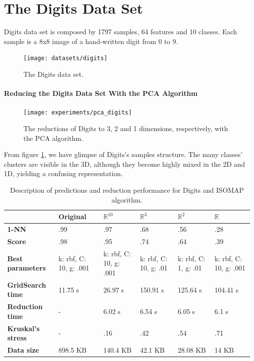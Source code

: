 \clearpage
\section{The Digits Data Set}

Digits data set is composed by 1797 samples, 64 features and 10 classes. Each sample is a 8x8 image of a hand-written digit from 0 to 9.
\newline\newline

\begin{figure}[H]
	\centering
	\captionsetup{justification=centering}
	\texttt{[image: datasets/digits]}
	\caption{The Digits data set.}
\end{figure}

\newpage
\paragraph{Reducing the Digits Data Set With the PCA Algorithm}

\begin{figure}[H]
	\centering
	\captionsetup{justification=centering}
	\texttt{[image: experiments/pca\_digits]}
	\caption{The reductions of Digits to 3, 2 and 1 dimensions, respectively, with the PCA algorithm.}
	\label{fig:dsdigitspca}
\end{figure}

From figure \ref{fig:dsdigitspca}, we have glimpse of Digits's samples structure. The many classes' clusters are visible in the 3D, although they become highly mixed in the 2D and 1D, yielding a confusing representation.

\begin{table}[H]
	\centering
	
	\begin{tabular}{|p{.14\linewidth}|p{.14\linewidth}|p{.14\linewidth}|p{.14\linewidth}|p{.14\linewidth}|p{.14\linewidth}|}
		\hline
		& \textbf{Original} & $\mathbb{R}^{10}$ & $\mathbb{R}^3$ & $\mathbb{R}^2$ & $\mathbb{R}$ \\\hline
		\textbf{1-NN} & .99 & .97 & .68 & .56 & .28 \\\hline
		\textbf{Score} & .98 & .95 & .74 & .64 & .39  \\\hline
		\textbf{Best parameters} & k: rbf, C: 10, g: .001 & k: rbf, C: 10, g: .001 & k: rbf, C: 10, g: .01 & k: rbf, C: 1, g: .01 & k: rbf, C: 10, g: .001\\\hline
		\textbf{GridSearch time} & 11.75 s & 26.97 s & 150.91 s & 125.64 s & 104.41 s \\\hline
		\textbf{Reduction time} & - & 6.02 s & 6.54 s & 6.05 s & 6.1 s \\\hline
		\textbf{Kruskal's stress} & - & .16 & .42 & .54 & .71 \\\hline
		\textbf{Data size} & 898.5 KB & 140.4 KB & 42.1 KB & 28.08 KB & 14 KB \\\hline
	\end{tabular}
	
	\caption{Description of predictions and reduction performance for Digits and ISOMAP algorithm.}
\end{table}

